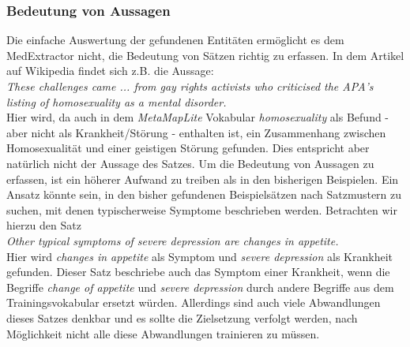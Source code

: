 \subsubsection{Bedeutung von Aussagen}
\label{subsec: bedeutung} 

Die einfache Auswertung der gefundenen Entitäten ermöglicht es dem MedExtractor nicht, die Bedeutung von Sätzen richtig zu erfassen. In dem Artikel auf Wikipedia findet sich z.B. die Aussage:\\

\emph{\glqq These challenges came ... from gay rights activists who criticised the APA's listing of homosexuality as a mental disorder.\grqq}\\

Hier wird, da auch in dem \emph{MetaMapLite} Vokabular \emph{homosexuality} als Befund - aber nicht als Krankheit/Störung - enthalten ist, ein Zusammenhang zwischen Homosexualität und einer geistigen Störung gefunden. Dies entspricht aber natürlich nicht der Aussage des Satzes. Um die Bedeutung von Aussagen zu erfassen, ist ein höherer Aufwand zu treiben als in den bisherigen Beispielen. Ein Ansatz könnte sein, in den bisher gefundenen Beispielsätzen nach Satzmustern zu suchen, mit denen typischerweise Symptome beschrieben werden. Betrachten wir hierzu den Satz\\

\emph{\glqq Other typical symptoms of severe depression are changes in appetite.\grqq}\\

Hier wird \emph{changes in appetite} als Symptom und \emph{severe depression} als Krankheit gefunden. Dieser Satz beschriebe auch das Symptom einer Krankheit, wenn die Begriffe \emph{change of appetite} und \emph{severe depression} durch andere Begriffe aus dem Trainingsvokabular ersetzt würden. Allerdings sind auch viele Abwandlungen dieses Satzes denkbar und es sollte die Zielsetzung verfolgt werden, nach Möglichkeit nicht alle diese Abwandlungen trainieren zu müssen.

